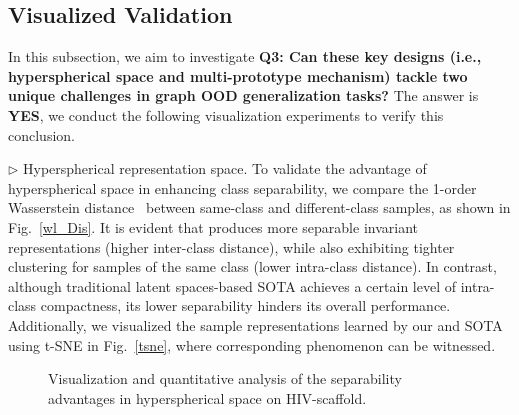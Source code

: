 \subsection{Visualized Validation}
In this subsection, we aim to investigate \textbf{Q3: Can these key designs (i.e., hyperspherical space and multi-prototype mechanism) tackle two unique challenges in graph OOD generalization tasks?} The answer is \textbf{YES}, we conduct the following visualization experiments to verify this conclusion. %

\noindent$\rhd$ \textsf{Hyperspherical representation space.} To validate the advantage of hyperspherical space in enhancing class separability, we compare the 1-order Wasserstein distance~\cite{villani2009optimal} between same-class and different-class samples, as shown in Fig.~\ref{wl_Dis}.
It is evident that \ourmethod produces more separable invariant representations (higher inter-class distance), while also exhibiting tighter clustering for samples of the same class (lower intra-class distance). In contrast, although traditional latent spaces-based SOTA  achieves a certain level of intra-class compactness, its lower separability hinders its overall performance. Additionally, we visualized the sample representations learned by our \ourmethod and SOTA using t-SNE in Fig.~\ref{tsne}, where corresponding phenomenon can be witnessed.





\begin{figure}[t]
\vspace{-3mm}
\centering 
{}
\vspace{-3mm}
\caption{Visualization and quantitative analysis of the separability advantages in hyperspherical space on HIV-scaffold.}
\vspace{-4mm}
\end{figure}

